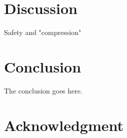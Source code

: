 \documentclass[conference]{IEEEtran}
\begin{document}
%



\section{Discussion}
Safety and "compression"
\section{Conclusion}
The conclusion goes here.






\section*{Acknowledgment}
\end{document}
